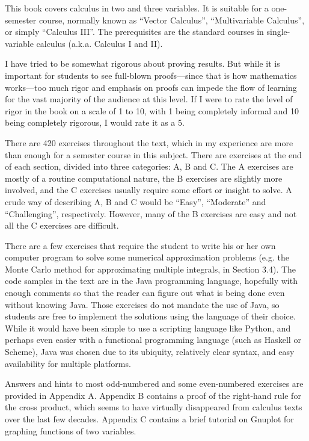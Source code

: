 This book covers calculus in two and three variables. It is suitable for a one-semester course, normally known as
``Vector Calculus'', ``Multivariable Calculus'', or simply ``Calculus III''. The prerequisites are the standard courses
in single-variable calculus (a.k.a. Calculus I and II).

I have tried to be somewhat rigorous about proving results. But while it is important for students to
see full-blown proofs---since that is how mathematics works---too much rigor and emphasis on proofs
can impede the flow
of learning for the vast majority of the audience at this level. If I were to rate the level of rigor in the book on a
scale of 1 to 10, with 1 being completely informal and 10 being completely rigorous, I would rate it as a 5.

There are 420 exercises throughout the text, which in my experience are more than enough for a semester course in
this subject.
There are exercises at the end of each section, divided into three categories: A, B and C. The A exercises are mostly
of a routine computational nature, the B exercises are slightly more involved, and the C exercises usually require
some effort or insight to solve. A crude way of describing A, B and C would be ``Easy'', ``Moderate'' and
``Challenging'', respectively. However, many of the B exercises are easy and not all
the C exercises are difficult.

There are a few exercises that require the student to write his or her own computer program
to solve some numerical approximation problems (e.g. the Monte Carlo method for approximating multiple integrals, in
Section 3.4).
The code samples in the text are in the Java programming language, hopefully with enough comments so that the reader can
figure out what is being done even without knowing Java. Those exercises do not mandate the use of Java, so
students are free to implement the solutions using the language of their choice. While it would have been simple to
use a scripting language like Python, and perhaps even easier with a functional programming language (such as Haskell or
Scheme), Java was chosen due to its ubiquity, relatively clear syntax, and easy availability for multiple platforms.

Answers and hints to most odd-numbered and some even-numbered exercises are
provided in Appendix A. Appendix B contains a proof of the right-hand rule for the cross product, which seems to have
virtually disappeared from calculus texts
over the last few decades. Appendix C contains a brief tutorial on Gnuplot for graphing functions of two variables.

